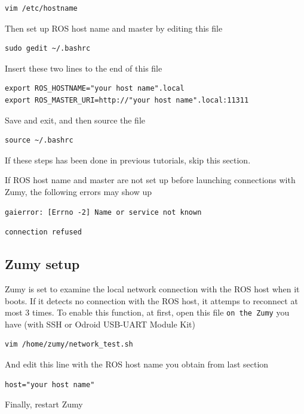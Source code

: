 \documentclass{article}
\begin{document}
\begin{Verbatim}[frame=single]
vim /etc/hostname
\end{Verbatim}

Then set up ROS host name and master by editing this file

\begin{Verbatim}[frame=single]
sudo gedit ~/.bashrc
\end{Verbatim}

Insert these two lines to the end of this file

\begin{Verbatim}[frame=single]
export ROS_HOSTNAME="your host name".local
export ROS_MASTER_URI=http://"your host name".local:11311
\end{Verbatim}

Save and exit, and then source the file

\begin{Verbatim}[frame=single]
source ~/.bashrc
\end{Verbatim}

If these steps has been done in previous tutorials, skip this section.

If ROS host name and master are not set up before launching connections with Zumy, the following errors may show up

\begin{Verbatim}[frame=single]
gaierror: [Errno -2] Name or service not known
\end{Verbatim}

\begin{Verbatim}[frame=single]
connection refused
\end{Verbatim}

\subsection{Zumy setup}
Zumy is set to examine the local network connection with the ROS host when it boots. If it detects no connection with the ROS host, it attemps to reconnect at most 3 times. To enable this function, at first, open this file \verb=on the Zumy= you have (with SSH or Odroid USB-UART Module Kit)
\begin{Verbatim}[frame=single]
vim /home/zumy/network_test.sh
\end{Verbatim}
And edit this line with the ROS host name you obtain from last section
\begin{Verbatim}[frame=single]
host="your host name"
\end{Verbatim}
Finally, restart Zumy
\end{document}
